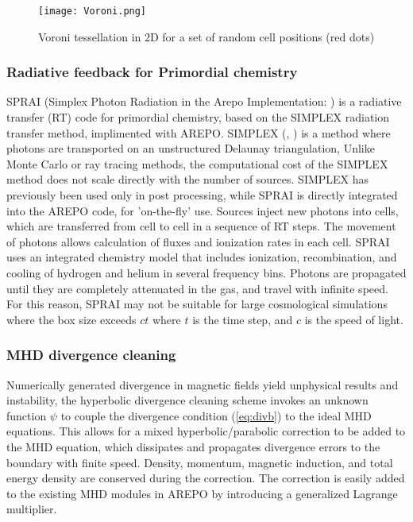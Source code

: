 \documentclass[11pt]{article}
\begin{document}
\begin{figure}[!htb]
         \centering
		\texttt{[image: Voroni.png]}
		\caption{Voroni tessellation in 2D for a set of random cell positions (red dots) \citep{Springel2010}}
		\label{fig:voroni}
\end{figure}

\subsubsection{Radiative feedback for Primordial chemistry}
SPRAI (Simplex Photon Radiation in the Arepo Implementation: \citealt{Jaura2018}) is a radiative transfer (RT) code for primordial chemistry, based on the SIMPLEX radiation transfer method, implimented with AREPO. SIMPLEX (\citealt{Ritzerveld2006}, \citealt{Kruip2010}) is a method where photons are transported on an unstructured Delaunay triangulation, Unlike Monte Carlo or ray tracing methods, the computational cost of the SIMPLEX method does not scale directly with the number of sources. SIMPLEX has previously been used only in post processing, while SPRAI is directly integrated into the AREPO code, for 'on-the-fly' use. Sources inject new photons into cells, which are transferred from cell to cell in a sequence of RT steps. The movement of photons allows calculation of fluxes and ionization rates in each cell. SPRAI uses an integrated chemistry model that includes ionization, recombination, and cooling of hydrogen and helium in several frequency bins. Photons are propagated until they are completely attenuated in the gas, and travel with infinite speed. For this reason, SPRAI may not be suitable for large cosmological simulations where the box size exceeds $ct$ where $t$ is the time step, and $c$ is the speed of light.

\subsubsection{MHD divergence cleaning}
Numerically generated divergence in magnetic fields yield unphysical results and instability, the \cite{Dedner2002} hyperbolic divergence cleaning scheme invokes an unknown function $\psi$ to couple the divergence condition (\ref{eq:divb}) to the ideal MHD equations. This allows for a mixed hyperbolic/parabolic correction to be added to the MHD equation, which dissipates and propagates divergence errors to the boundary with finite speed. Density, momentum, magnetic induction, and total energy density are conserved during the correction. The correction is easily added to the existing MHD modules in AREPO by introducing a generalized Lagrange multiplier.
\end{document}
